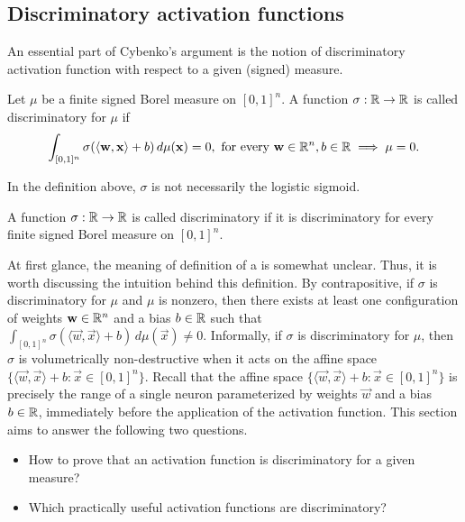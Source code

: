 \subsection{Discriminatory activation functions}
\label{subsection:universality:cybenko:1}
An essential part of Cybenko's argument is the notion of discriminatory activation function with respect to a given (signed) measure.

\begin{definition}
\label{defn:discrim:discrimactfn}
Let $\mu$ be a finite signed Borel measure on $[0,1]^n$. A function $\sigma : {\mathbb R} \to {\mathbb R}$ is called discriminatory for $\mu$ if
\[
    \int_{[0,1]^n}\sigma(\langle \mathbf{w}, \mathbf{x} \rangle + b) \, d \mu(\mathbf{x}) = 0, \text{ for every } \mathbf{w} \in {\mathbb R}^n, b \in {\mathbb R}  \implies \mu = 0.
\]
\end{definition}
\begin{remark}
In the definition above, $\sigma$ is not necessarily the logistic sigmoid.
\end{remark}
\begin{definition}
A function $\sigma : {\mathbb R} \to {\mathbb R}$ is called discriminatory if it is discriminatory for every finite signed Borel measure on $[0,1]^n$.
\end{definition}

At first glance, the meaning of definition of a  is somewhat unclear. Thus, it is worth discussing the intuition behind this definition. By contrapositive, if $\sigma$ is discriminatory for $\mu$ and $\mu$ is nonzero, then there exists at least one configuration of weights $\mathbf{w} \in {\mathbb R}^n$ and a bias $b \in {\mathbb R}$ such that $\int_{[0,1]^n} \sigma(\langle \vec{w}, \vec{x} \rangle + b) \, d \mu (\vec{x}) \neq 0$. Informally, if $\sigma$ is discriminatory for $\mu$, then $\sigma$ is volumetrically non-destructive when it acts on the affine space $\{ \langle \vec{w}, \vec{x} \rangle + b : \vec{x} \in [0,1]^n \}$. Recall that the affine space $\{ \langle \vec{w}, \vec{x} \rangle + b : \vec{x} \in [0,1]^n \}$ is precisely the range of a single neuron parameterized by weights $\vec{w}$ and a bias $b \in {\mathbb R}$, immediately before the application of the activation function. This section aims to answer the following two questions.
\begin{itemize}[noitemsep]
\item How to prove that an activation function is discriminatory for a given measure?
\item Which practically useful activation functions are discriminatory?
\end{itemize}

